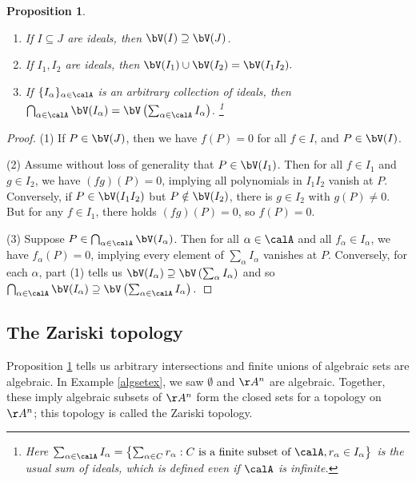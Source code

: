 \documentclass[12pt]{amsart}
\theoremstyle{plain}
\newtheorem{proposition}[theorem]{Proposition}
\begin{document}
\begin{proposition}\label{vproperties}
\begin{enumerate}
\item If $I \subseteq J$ are ideals, then $\bV(I) \supseteq \bV(J)$.
\item If $I_1, I_2$ are ideals, then $\bV(I_1) \cup \bV(I_2) = \bV(I_1 I_2).$
\item If $\{I_\alpha\}_{\alpha \in \calA}$ is an arbitrary collection of ideals, then $\bigcap_{\alpha \in \calA} \bV(I_\alpha) = \bV\left(\sum_{\alpha \in \calA} I_\alpha\right)$.
\footnote{Here $\sum_{\alpha\in\calA} I_\alpha = \left\{\sum_{\alpha \in C} r_\alpha : C \text{ is a finite subset of } \calA, r_\alpha \in I_\alpha \right\}$ is the usual sum of ideals, which is defined even if $\calA$ is infinite.}
\end{enumerate}
\end{proposition}
\begin{proof}
(1) If $P \in \bV(J)$, then we have $f(P)=0$ for all $f \in I$, and $P \in \bV(I)$.

(2) Assume without loss of generality that $P \in \bV(I_1)$.
Then for all $f \in I_1$ and $g \in I_2$, we have $(fg)(P)=0$, implying all polynomials in $I_1 I_2$ vanish at $P$.
Conversely, if $P \in \bV(I_1 I_2)$ but $P \notin \bV(I_2)$, there is $g \in I_2$ with $g(P) \ne 0$.
But for any $f \in I_1$, there holds $(fg)(P)=0$, so $f(P)=0$.

(3) Suppose $P \in \bigcap_{\alpha \in \calA} \bV(I_\alpha)$.
Then for all $\alpha \in \calA$ and all $f_\alpha \in I_\alpha$, we have $f_\alpha(P) = 0$, implying every element of $\sum_{\alpha} I_\alpha$ vanishes at $P$.
Conversely, for each $\alpha$, part (1) tells us $\bV(I_\alpha) \supseteq \bV\left(\sum_{\alpha} I_\alpha\right)$ and so 
$\bigcap_{\alpha\in\calA} \bV(I_\alpha) \supseteq \bV\left(\sum_{\alpha\in\calA} I_\alpha\right).$
\end{proof}





\subsection{The Zariski topology}
Proposition \ref{vproperties} tells us arbitrary intersections and finite unions of algebraic sets are algebraic.
In Example \ref{algsetex}, we saw $\emptyset$ and $\AA^n$ are algebraic.
Together, these imply algebraic subsets of $\AA^n$ form the closed sets for a topology on $\AA^n$; this topology is called the Zariski topology.
\end{document}
